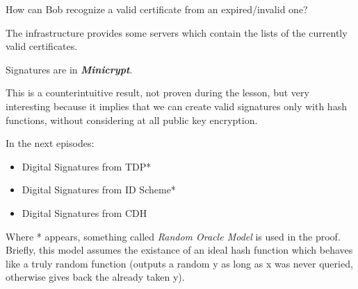 \begin{figure}
   \centering
   \sdinit{}
\end{figure}

How can Bob recognize a valid certificate from an expired/invalid one?

The infrastructure provides some servers which contain the lists of the currently valid certificates.

\begin{theorem}
    Signatures are in \textit{\textbf{Minicrypt}}.
\end{theorem}

This is a counterintuitive result, not proven during the lesson, but very interesting because it implies that we can create valid signatures only with hash functions, without considering at all public key encryption.


In the next episodes:
\begin{itemize}
    \item Digital Signatures from TDP*
    \item Digital Signatures from ID Scheme*
    \item Digital Signatures from CDH
\end{itemize}

Where * appears, something called \textit{Random Oracle Model} is used in the proof. Briefly, this model assumes the existance of an ideal hash function which behaves like a truly random function (outputs a random y as long as x was never queried, otherwise gives back the already taken y).

